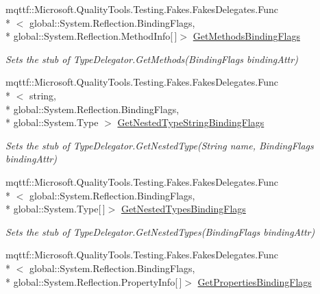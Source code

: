 \begin{DoxyCompactItemize}
mqttf\-::\-Microsoft.\-Quality\-Tools.\-Testing.\-Fakes.\-Fakes\-Delegates.\-Func\\*
$<$ global\-::\-System.\-Reflection.\-Binding\-Flags, \\*
global\-::\-System.\-Reflection.\-Method\-Info\mbox{[}$\,$\mbox{]}$>$ \hyperlink{class_system_1_1_reflection_1_1_fakes_1_1_stub_type_delegator_a42a1e3413590712e4d226e0ab2af2fd3}{Get\-Methods\-Binding\-Flags}
\begin{DoxyCompactList}\small\item\em Sets the stub of Type\-Delegator.\-Get\-Methods(\-Binding\-Flags binding\-Attr)\end{DoxyCompactList}\item 
mqttf\-::\-Microsoft.\-Quality\-Tools.\-Testing.\-Fakes.\-Fakes\-Delegates.\-Func\\*
$<$ string, \\*
global\-::\-System.\-Reflection.\-Binding\-Flags, \\*
global\-::\-System.\-Type $>$ \hyperlink{class_system_1_1_reflection_1_1_fakes_1_1_stub_type_delegator_a83edb77f080da08974aaa70f90a2db64}{Get\-Nested\-Type\-String\-Binding\-Flags}
\begin{DoxyCompactList}\small\item\em Sets the stub of Type\-Delegator.\-Get\-Nested\-Type(\-String name, Binding\-Flags binding\-Attr)\end{DoxyCompactList}\item 
mqttf\-::\-Microsoft.\-Quality\-Tools.\-Testing.\-Fakes.\-Fakes\-Delegates.\-Func\\*
$<$ global\-::\-System.\-Reflection.\-Binding\-Flags, \\*
global\-::\-System.\-Type\mbox{[}$\,$\mbox{]}$>$ \hyperlink{class_system_1_1_reflection_1_1_fakes_1_1_stub_type_delegator_a661bb5314b7c0386354ee1eed237c690}{Get\-Nested\-Types\-Binding\-Flags}
\begin{DoxyCompactList}\small\item\em Sets the stub of Type\-Delegator.\-Get\-Nested\-Types(\-Binding\-Flags binding\-Attr)\end{DoxyCompactList}\item 
mqttf\-::\-Microsoft.\-Quality\-Tools.\-Testing.\-Fakes.\-Fakes\-Delegates.\-Func\\*
$<$ global\-::\-System.\-Reflection.\-Binding\-Flags, \\*
global\-::\-System.\-Reflection.\-Property\-Info\mbox{[}$\,$\mbox{]}$>$ \hyperlink{class_system_1_1_reflection_1_1_fakes_1_1_stub_type_delegator_a3b19562cd2c8c3ebb04d351a12b5e464}{Get\-Properties\-Binding\-Flags}

\end{DoxyCompactItemize}
